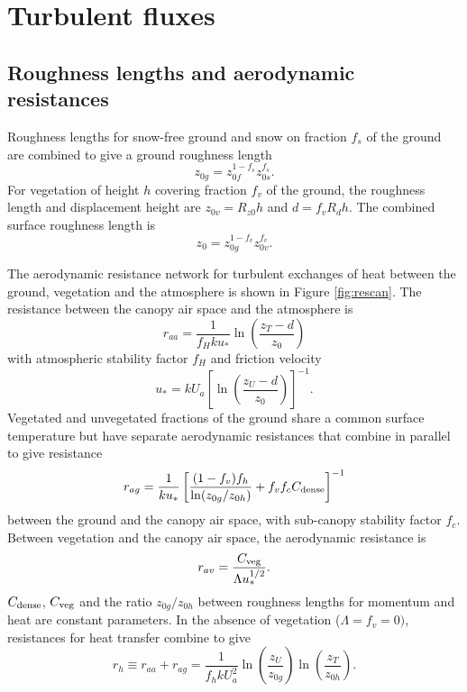 \documentclass{article}
\begin{document}
\section{Turbulent fluxes}

\subsection{Roughness lengths and aerodynamic resistances}

Roughness lengths for snow-free ground and snow on fraction $f_s$ of the ground are combined to give a ground roughness length
\begin{equation}
z_{0g} =  z_{0f}^{1-f_s} z_{0s}^{f_s}.
\end{equation}
For vegetation of height $h$ covering fraction $f_v$ of the ground, the roughness length and displacement height are $z_{0v} = R_{z0}h$ and $d = f_vR_dh$. The combined surface roughness length is
\begin{equation}
z_0 = z_{0g}^{1-f_v} z_{0v}^{f_v}.
\end{equation}

The aerodynamic resistance network for turbulent exchanges of heat between the ground, vegetation and the atmosphere is shown in Figure \ref{fig:rescan}. The resistance between the canopy air space and the atmosphere is
\begin{equation}
r_{aa} = \frac{1}{f_H k u_*}\ln\left(\frac{z_T-d}{z_0}\right)
\label{eq:raa} 
\end{equation}
with atmospheric stability factor $f_H$ and friction velocity
\begin{equation}
u_* = kU_a\left[\ln\left(\frac{z_U-d}{z_0}\right)\right]^{-1}.
\end{equation}
Vegetated and unvegetated fractions of the ground share a common surface temperature but have separate aerodynamic resistances that combine in parallel to give resistance
\begin{equation}
r_{ag} = \frac{1}{ku_*}\left[\frac{(1-f_v)f_h}{\ln(z_{0g}/z_{0h})} + 
                             f_vf_cC_{\rm dense}\right]^{-1}
\label{eq:rag} 
\end{equation}
between the ground and the canopy air space, with sub-canopy stability factor $f_c$. Between vegetation and the canopy air space, the aerodynamic resistance is
\begin{equation}
r_{av} = \frac{C_{\rm veg}}{\Lambda u_*^{1/2}}.
\end{equation}
$C_{\rm dense}$, $C_{\rm veg}$ and the ratio $z_{0g}/z_{0h}$ between roughness lengths for momentum and heat are constant parameters. In the absence of vegetation ($\Lambda=f_v=0)$, resistances for heat transfer combine to give
\begin{equation}
r_h \equiv r_{aa} + r_{ag} = \frac{1}{f_hkU_a^2}\ln\left(\frac{z_U}{z_{0g}}\right)
                                                \ln\left(\frac{z_T}{z_{0h}}\right).
\label{eq:rh}
\end{equation}
\end{document}

